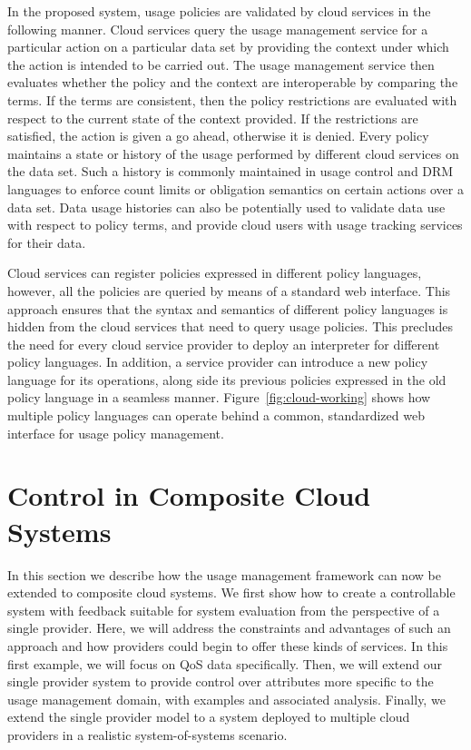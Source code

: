 \documentclass[notitlepage]{book}
\begin{document}
\begin{doublespace}
In the proposed system, usage policies are validated by cloud services in the following manner. Cloud services query the usage management service for a particular action on a particular data set by providing the context under which the action is intended to be carried out. The usage management service then evaluates whether the policy and the context are interoperable by comparing the terms. If the terms are consistent, then the policy restrictions are evaluated with respect to the current state of the context provided. If the restrictions are satisfied, the action is given a go ahead, otherwise it is denied. Every policy maintains a state or history of the usage performed by different cloud services on the data set. Such a history is commonly maintained in usage control and DRM languages to enforce count limits or obligation semantics on certain actions over a data set. Data usage histories can also be potentially used to validate data use with respect to policy terms, and provide cloud users with usage tracking services for their data.

Cloud services can register policies expressed in different policy languages,  however, all the policies are queried by means of a standard web interface. This approach ensures that the syntax and semantics of different policy languages is hidden from the cloud services that need to query usage policies. This precludes the need for every cloud service provider to deploy an interpreter for different policy languages. In addition, a service provider can introduce a new policy language for its operations, along side its previous policies expressed in the old policy language in a seamless manner. Figure~\ref{fig:cloud-working} shows how multiple policy languages can operate behind a common, standardized web interface for usage policy management.

\section{Control in Composite Cloud Systems}
\label{sec:composite}
In this section we describe how the usage management framework can now be extended to composite cloud systems. We first show how to create a controllable system with feedback suitable for system evaluation from the perspective of a single provider. Here, we
will address the constraints and advantages of such an approach and how providers could begin to offer these kinds of services. In this first example, we will focus on QoS data specifically. Then, we will extend our single provider system to provide control over attributes more specific to the usage management domain, with examples and associated analysis. Finally, we extend the single provider model to a system deployed to multiple cloud providers in a realistic system-of-systems scenario.



\end{doublespace}
\end{document}
